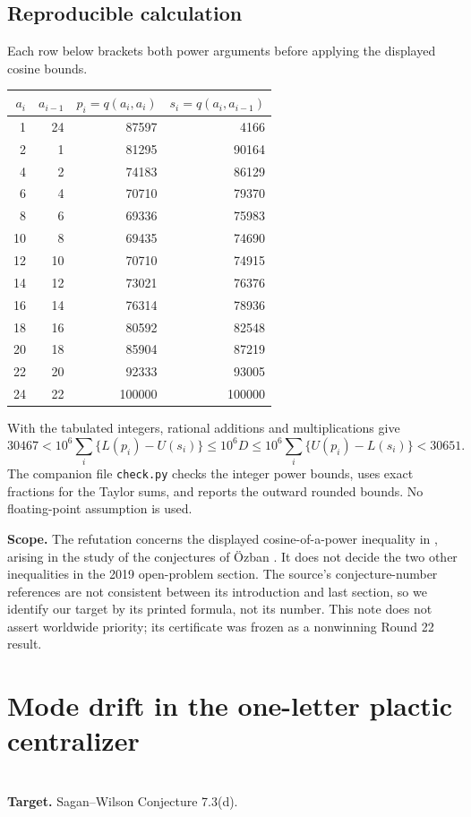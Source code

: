 \documentclass[11pt,a4paper]{article}
\begin{document}
\subsection*{Reproducible calculation}
Each row below brackets both power arguments before applying the displayed cosine bounds.
\begin{center}
\begin{tabular}{rrrr}
\toprule
$a_i$ & $a_{i-1}$ & $p_i=q(a_i,a_i)$ & $s_i=q(a_i,a_{i-1})$\\
\midrule
1&24&87597&4166\\
2&1&81295&90164\\
4&2&74183&86129\\
6&4&70710&79370\\
8&6&69336&75983\\
10&8&69435&74690\\
12&10&70710&74915\\
14&12&73021&76376\\
16&14&76314&78936\\
18&16&80592&82548\\
20&18&85904&87219\\
22&20&92333&93005\\
24&22&100000&100000\\
\bottomrule
\end{tabular}
\end{center}
With the tabulated integers, rational additions and multiplications give
\[
30467 < 10^6\sum_i \{L(p_i)-U(s_i)\}\le 10^6D
\le 10^6\sum_i \{U(p_i)-L(s_i)\}<30651.
\]
The companion file \texttt{check.py} checks the integer power bounds, uses exact fractions for the Taylor sums, and reports the outward rounded bounds. No floating-point assumption is used.

\textbf{Scope.} The refutation concerns the displayed cosine-of-a-power inequality in \cite[\S3(a)]{R22M:M19}, arising in the study of the conjectures of \"Ozban \cite{R22M:O}. It does not decide the two other inequalities in the 2019 open-problem section. The source's conjecture-number references are not consistent between its introduction and last section, so we identify our target by its printed formula, not its number. This note does not assert worldwide priority; its certificate was frozen as a nonwinning Round 22 result.
\endgroup


\clearpage

\section{Mode drift in the one-letter plactic centralizer}
\label{section:R24K}
\\[3pt]
\noindent\textbf{Target.} Sagan--Wilson Conjecture 7.3(d).
\end{document}
